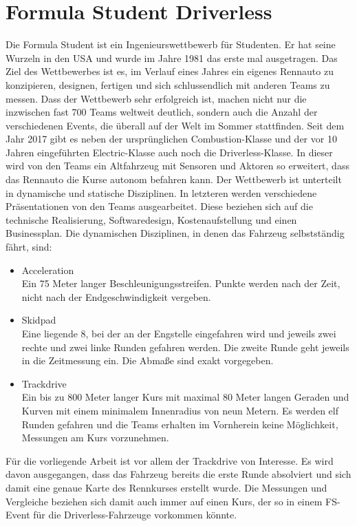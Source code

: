 \documentclass{like}
\begin{document}
\section{Formula Student Driverless}
Die Formula Student ist ein Ingenieurswettbewerb für Studenten. Er hat seine Wurzeln in den USA und wurde im Jahre 1981 das erste mal ausgetragen. Das Ziel des Wettbewerbes ist es, im Verlauf eines Jahres ein eigenes Rennauto zu konzipieren, designen, fertigen und sich schlussendlich mit anderen Teams zu messen. Dass der Wettbewerb sehr erfolgreich ist, machen nicht nur die inzwischen fast 700 Teams weltweit \cite{FsWorldRank:1} deutlich, sondern auch die Anzahl der verschiedenen Events, die überall auf der Welt im Sommer stattfinden. Seit dem Jahr 2017 gibt es neben der ursprünglichen Combustion-Klasse und der vor 10 Jahren eingeführten Electric-Klasse auch noch die Driverless-Klasse.
In dieser wird von den Teams ein Altfahrzeug mit Sensoren und Aktoren so erweitert, dass das Rennauto die Kurse autonom befahren kann.
Der Wettbewerb ist unterteilt in dynamische und statische Disziplinen. In letzteren werden verschiedene Präsentationen von den Teams ausgearbeitet. Diese beziehen sich auf die technische Realisierung, Softwaredesign, Kostenaufstellung und einen Businessplan.
Die dynamischen Disziplinen, in denen das Fahrzeug selbstständig fährt, sind:
\begin{itemize}
	\item Acceleration \\ Ein 75 Meter langer Beschleunigungsstreifen. Punkte werden nach der Zeit, nicht nach der Endgeschwindigkeit vergeben.
	\item Skidpad \\ Eine liegende 8, bei der an der Engstelle eingefahren wird und jeweils zwei rechte und zwei linke Runden gefahren werden. Die zweite Runde geht jeweils in die Zeitmessung ein. Die Abmaße sind exakt vorgegeben.
	\item Trackdrive \\ Ein bis zu 800 Meter langer Kurs mit maximal 80 Meter langen Geraden und Kurven mit einem minimalem Innenradius von neun Metern. Es werden elf Runden gefahren und die Teams erhalten im Vornherein keine Möglichkeit, Messungen am Kurs vorzunehmen.
\end{itemize}

Für die vorliegende Arbeit ist vor allem der Trackdrive von Interesse. Es wird davon ausgegangen, dass das Fahrzeug bereits die erste Runde absolviert und sich damit eine genaue Karte des Rennkurses erstellt wurde. Die Messungen und Vergleiche beziehen sich damit auch immer auf einen Kurs, der so in einem \ac{FS}-Event für die Driverless-Fahrzeuge vorkommen könnte.
\end{document}
